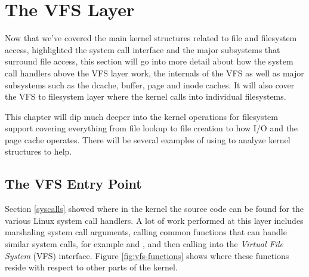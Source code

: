 \chapter{The VFS Layer}\label{vfs}


Now that we've covered the main kernel structures related to file and filesystem access, highlighted the system call interface and the major subsystems that surround file access, this section will go into more detail about how the system call handlers above the VFS layer work, the internals of the VFS as well as major subsystems such as the dcache, buffer, page and inode caches. It will also cover the VFS to filesystem layer where the kernel calls into individual filesystems.

This chapter will dip much deeper into the kernel operations for filesystem support covering everything from file lookup to file creation to how I/O and the page cache operates. There will be several examples of using  to analyze kernel structures to help.


\section{The VFS Entry Point}

Section \ref{syscalls} showed where in the kernel the source code can be found for the various Linux system call handlers. A lot of work performed at this layer includes marshaling system call arguments, calling common functions that can handle similar system calls, for example  and , and then calling into the \textit{Virtual File System} (VFS) interface. Figure \ref{fig:vfs-functions} shows where these functions reside with respect to other parts of the kernel.

